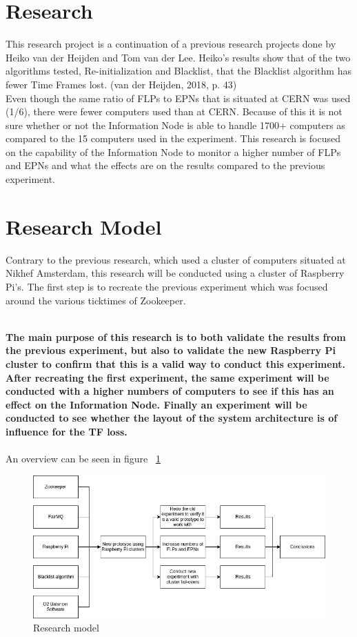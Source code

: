 

\section{Research}
This research project is a continuation of a previous research projects done by Heiko van der Heijden and Tom van der Lee. Heiko's results show that of the two algorithms tested, Re-initialization and Blacklist, that the Blacklist algorithm has fewer Time Frames lost. (van der Heijden, 2018, p. 43)\\
Even though the same ratio of FLPs to EPNs that is situated at CERN was used (1/6), there were fewer computers used than at CERN. Because of this it is not sure whether or not the Information Node is able to handle 1700+ computers as compared to the 15 computers used in the experiment. This research is focused on the capability of the Information Node to monitor a higher number of FLPs and EPNs and what the effects are on the results compared to the previous experiment.\\

\section{Research Model}
Contrary to the previous research, which used a cluster of computers situated at Nikhef Amsterdam, this research will be conducted using a cluster of Raspberry Pi's. The first step is to recreate the previous experiment which was focused around the various ticktimes of Zookeeper.
\newpage

~\\\textbf{The main purpose of this research is to both validate the results from the previous experiment, but also to validate the new Raspberry Pi cluster to confirm that this is a valid way to conduct this experiment. After recreating the first experiment, the same experiment will be conducted with a higher numbers of computers to see if this has an effect on the Information Node. Finally an experiment will be conducted to see whether the layout of the system architecture is of influence for the TF loss.} \\~\\
An overview can be seen in figure ~\ref{fig:ResearchModel}

\begin{figure}[htb]
	\centering
	\includegraphics[width=\textwidth,height=\textheight,keepaspectratio]{./graphics/ResearchModel.png}
	\caption{Research model}
	\label{fig:ResearchModel}
\end{figure}


